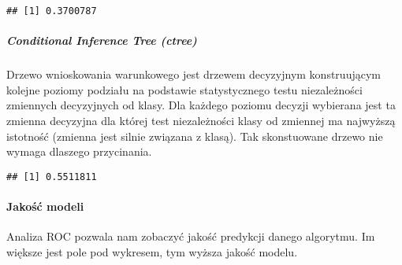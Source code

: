 \documentclass[
]{article}
\newenvironment{Shaded}{\begin{snugshade}}{\end{snugshade}}
\newcommand{\DataTypeTok}[1]{\textcolor[rgb]{0.13,0.29,0.53}{#1}}
\newcommand{\KeywordTok}[1]{\textcolor[rgb]{0.13,0.29,0.53}{\textbf{#1}}}
\newcommand{\NormalTok}[1]{#1}
\newcommand{\OperatorTok}[1]{\textcolor[rgb]{0.81,0.36,0.00}{\textbf{#1}}}
\newcommand{\StringTok}[1]{\textcolor[rgb]{0.31,0.60,0.02}{#1}}
\begin{document}
\begin{verbatim}
## [1] 0.3700787
\end{verbatim}

\hypertarget{conditional-inference-tree-ctree}{%
\subparagraph{Conditional Inference Tree
(ctree)}\label{conditional-inference-tree-ctree}}

Drzewo wnioskowania warunkowego jest drzewem decyzyjnym konstruującym
kolejne poziomy podziału na podstawie statystycznego testu niezależności
zmiennych decyzyjnych od klasy. Dla każdego poziomu decyzji wybierana
jest ta zmienna decyzyjna dla której test niezależności klasy od
zmiennej ma najwyższą istotność (zmienna jest silnie związana z klasą).
Tak skonstuowane drzewo nie wymaga dlaszego przycinania.

\begin{Shaded}
\end{Shaded}

\begin{verbatim}
## [1] 0.5511811
\end{verbatim}

\hypertarget{jakoux15bux107-modeli}{%
\paragraph{Jakość modeli}\label{jakoux15bux107-modeli}}

Analiza ROC pozwala nam zobaczyć jakość predykcji danego algorytmu. Im
większe jest pole pod wykresem, tym wyższa jakość modelu.
\end{document}
